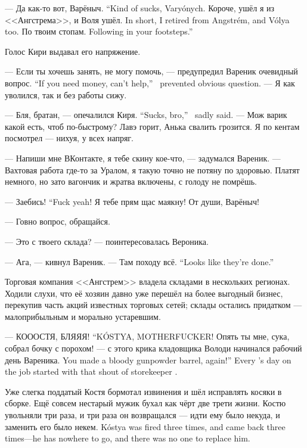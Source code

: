 {--- Да как-то вот, Варёныч.}
{``Kind of sucks, Vary\'onych.}
{Короче, ушёл я из <<Ангстрема>>, и Воля ушёл.}
{In short, I retired from Angstr\'em, and V\'olya too.}
{По твоим стопам.}
{Following in your footsteps.''}

Голос Кири выдавал его напряжение.

{--- Если ты хочешь занять, не могу помочь, --- предупредил Вареник очевидный вопрос.}
{``If you need money, can't help,'' \Varenik\ prevented obvious question.}
--- Я как уволился, так и без работы сижу.

{--- Бля, братан, --- опечалился Киря.}
{``Sucks, bro,'' \Kirya\ sadly said.}
--- Мож варик какой есть, чтоб по-быстрому?
Лавэ горит, Анька свалить грозится.
Я по кентам посмотрел --- нихуя, у всех напряг.

--- Напиши мне ВКонтакте, я тебе скину кое-что, --- задумался Вареник.
--- Вахтовая работа где-то за Уралом, я такую точно не потяну по здоровью.
Платят немного, но зато вагончик и жратва включены, с голоду не помрёшь.

{--- Заебись!}
{``Fuck yeah!}
Я тебе прям щас маякну!
От души, Варёныч!

--- Говно вопрос, обращайся.

--- Это с твоего склада? --- поинтересовалась Вероника.

--- Ага, --- кивнул Вареник.
{--- Там походу всё.}
{``Looks like they're done.''}

\asterism

Торговая компания <<Ангстрем>> владела складами в нескольких регионах.
Ходили слухи, что её хозяин давно уже перешёл на более выгодный бизнес, перекупив часть акций известных торговых сетей;
склады остались придатком --- малоприбыльным и морально устаревшим.

{--- КОООСТЯ, БЛЯЯЯ!}
{``K\'OSTYA, MOTHERFUCKER!}
{Опять ты мне, сука, собрал бочку с порохом! --- с этого крика кладовщика Володи начинался рабочий день Вареника.}
{You made a bloody gunpowder barrel, again!'' Every \Varenik's day on the job started with that shout of storekeeper \Volodya.}

Уже слегка поддатый Костя бормотал извинения и шёл исправлять косяки в сборке.
Ещё совсем нестарый мужик бухал как чёрт две трети жизни.
{Костю увольняли три раза, и три раза он возвращался --- идти ему было некуда, и заменить его было некем.}
{K\'ostya was fired three times, and came back three times---he has nowhere to go, and there was no one to replace him.}

